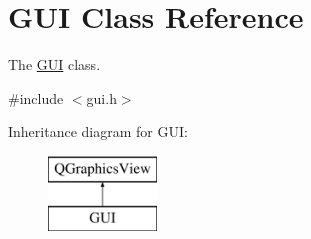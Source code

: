 \hypertarget{class_g_u_i}{}\section{G\+UI Class Reference}
\label{class_g_u_i}


The \hyperlink{class_g_u_i}{G\+UI} class.  




{\ttfamily \#include $<$gui.\+h$>$}

Inheritance diagram for G\+UI\+:\begin{figure}[H]
\begin{center}
\leavevmode
\includegraphics[height=2.000000cm]{class_g_u_i}
\end{center}
\end{figure}
